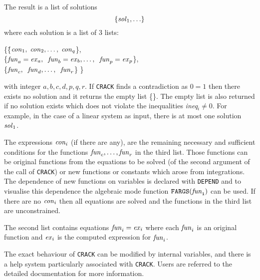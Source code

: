 The result is a list of solutions 
\[      \{{\it sol}_1, \ldots \}  \]
where each solution is a list of 3 lists:
\begin{tabbing}
       \{\=\{${\it con}_1, \; {\it con}_2, \ldots , \; {\it con}_q$\}, \\
         \>\{${\it fun}_a={\it ex}_a, \;\;
{\it fun}_b={\it ex}_b, \ldots , \;\; {\it fun}_p={\it ex}_p$\},\=  \\
         \>\{${\it fun}_c, \;\; {\it fun}_d, \ldots , \;\; {\it fun}_r$\} \>\}
\end{tabbing}
with integer $a, b, c, d, p, q, r.$
If {\tt CRACK} finds a contradiction as $0=1$ then there exists no
solution and it returns the empty list \{\}.
The empty list is also returned if no solution exists 
which does not violate the inequalities
{\it ineq}$_i \neq 0.$ 
For example, in the case of a linear system as input, there is
at most one solution ${\it sol}_1$.

The expressions ${\it con}_i$ (if there are any), are the
remaining necessary and sufficient conditions for the functions
${\it fun}_c,\ldots,{\it fun}_r$ in the third list.  Those
functions can be original functions from the equations to be
solved (of the second argument of the call of {\tt CRACK}) or new
functions or constants which arose from integrations. 
The dependence of new functions on variables is declared with {\tt DEPEND}
and to visualise this dependence the algebraic mode function
${\tt FARGS({\it fun}_i)}$ can be used.
If there are no ${\it con}_i$ then all equations are solved and the
functions in the third list are unconstrained.  

The second list contains
equations ${\it fun}_i={\it ex}_i$ where each ${\it fun}_i$ is an
original function and ${\it ex}_i$ is the computed expression
for ${\it fun}_i$.

The exact behaviour of {\tt CRACK} can be modified by internal
variables, and there is a help system particularly associated with
{\tt CRACK}.  Users are referred to the detailed documentation for
more information.

